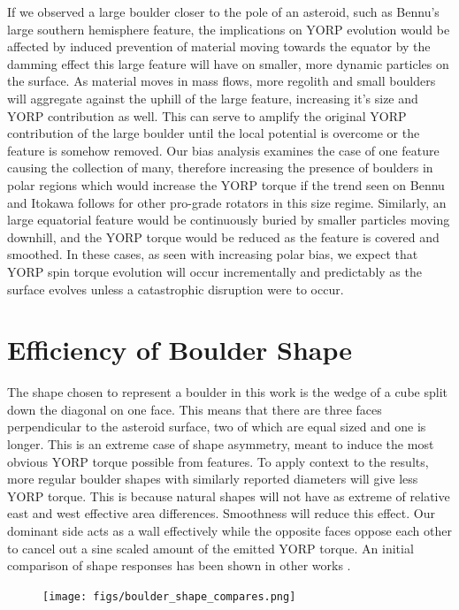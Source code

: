 If we observed a large boulder closer to the pole of an asteroid, such as Bennu's large southern hemisphere feature, the implications on YORP evolution would be affected by induced prevention of material moving towards the equator by the damming effect this large feature will have on smaller, more dynamic particles on the surface. As material moves in mass flows, more regolith and small boulders will aggregate against the uphill of the large feature, increasing it's size and YORP contribution as well. This can serve to amplify the original YORP contribution of the large boulder until the local potential is overcome or the feature is somehow removed. Our bias analysis examines the case of one feature causing the collection of many, therefore increasing the presence of boulders in polar regions which would increase the YORP torque if the trend seen on Bennu and Itokawa follows for other pro-grade rotators in this size regime. Similarly, an large equatorial feature would be continuously buried by smaller particles moving downhill, and the YORP torque would be reduced as the feature is covered and smoothed. In these cases, as seen with increasing polar bias, we expect that YORP spin torque evolution will occur incrementally and predictably as the surface evolves unless a catastrophic disruption were to occur. 


\section{Efficiency of Boulder Shape}

The shape chosen to represent a boulder in this work is the wedge of a cube split down the diagonal on one face. This means that there are three faces perpendicular to the asteroid surface, two of which are equal sized and one is longer. This is an extreme case of shape asymmetry, meant to induce the most obvious YORP torque possible from features. To apply context to the results, more regular boulder shapes with similarly reported diameters will give less YORP torque. This is because natural shapes will not have as extreme of relative east and west effective area differences. Smoothness will reduce this effect. Our dominant side acts as a wall effectively while the opposite faces oppose each other to cancel out a sine scaled amount of the emitted YORP torque. An initial comparison of shape responses has been shown in other works \citep{Golubov,2017}. 


\begin{figure}
    \centering
    \texttt{[image: figs/boulder\_shape\_compares.png]}
    \caption{}
    \label{}
\end{figure}




